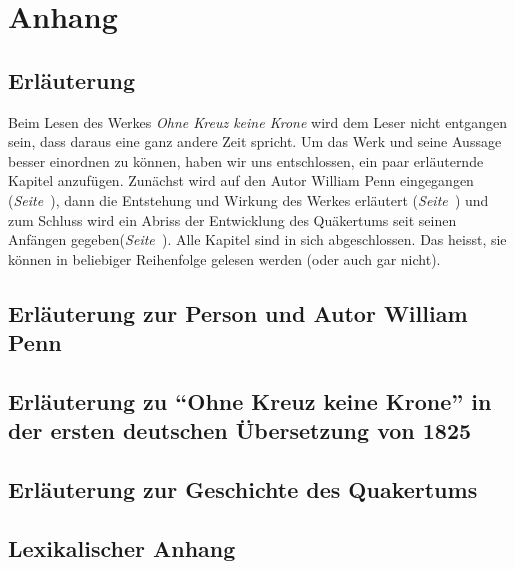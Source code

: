 \documentclass[pdftex,pagesize,9pt]{scrbook}
\begin{document}
\setcounter{secnumdepth}{0}


\part{Anhang}
\chapter{Erläuterung}

Beim Lesen des Werkes \textit{Ohne Kreuz keine Krone} wird dem Leser nicht
entgangen sein, dass daraus eine ganz andere Zeit spricht. Um das Werk und seine
Aussage besser einordnen zu können, haben wir uns entschlossen, ein paar
erläuternde Kapitel anzufügen. Zunächst wird auf den Autor
William Penn eingegangen (\textit{Seite~\pageref{ref:zum_autor_penn}}), dann die Entstehung und Wirkung des Werkes erläutert (\textit{Seite~\pageref{ref:zum_werk}}) und zum Schluss
wird ein Abriss der Entwicklung des Quäkertums seit seinen Anfängen
gegeben(\textit{Seite~\pageref{ref:entwicklung_quakertum}}). Alle Kapitel
sind in sich abgeschlossen. Das heisst, sie können in beliebiger Reihenfolge
gelesen werden (oder auch gar nicht).

\chapter{Erläuterung zur Person und Autor William Penn} \label{ref:zum_autor_penn}
 


\chapter[Erläuterung zu "`Ohne Kreuz keine Krone"']{Erläuterung zu "`Ohne Kreuz keine Krone"' in der ersten deutschen Übersetzung von 1825} \label{ref:zum_werk}




\chapter{Erläuterung zur Geschichte des Quakertums}
\label{ref:entwicklung_quakertum}



 



\chapter{Lexikalischer Anhang}

\end{document}
